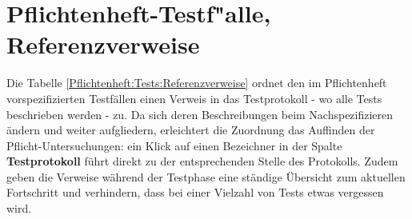 %



\newpage



\section{Pflichtenheft-Testf{"a}lle, Referenzverweise}
\label{Abschnitt:Tests:Protokoll:Pflichtenheft-Verweise}

Die Tabelle \ref{Pflichtenheft:Tests:Referenzverweise} ordnet den im Pflichtenheft vorspezifizierten Testfällen einen Verweis in das Testprotokoll - wo alle Tests beschrieben werden - zu. Da sich deren Beschreibungen beim Nachspezifizieren ändern und weiter aufgliedern, erleichtert die Zuordnung das Auffinden der Pflicht-Untersuchungen: ein Klick auf einen Bezeichner in der Spalte \textbf{Testprotokoll} führt direkt zu der entsprechenden Stelle des Protokolls. Zudem geben die Verweise während der Testphase eine ständige Übersicht zum aktuellen Fortschritt und verhindern, dass bei einer Vielzahl von Tests etwas vergessen wird.\\

 

